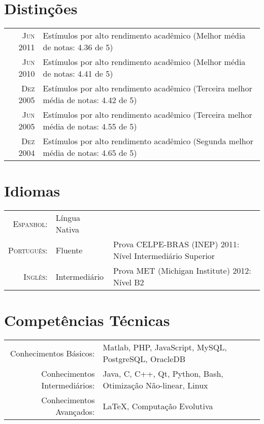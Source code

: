 \documentclass[a4paper,10pt]{article}
\begin{document}
\section{Distinções}
\begin{tabular}{rl}

  \textsc{Jun 2011} & Estímulos por alto rendimento acadêmico \footnotesize(Melhor média de notas: 4.36 de 5)\normalsize\\
  \textsc{Jun 2010} & Estímulos por alto rendimento acadêmico \footnotesize(Melhor média de notas: 4.41 de 5)\normalsize\\
  \textsc{Dez 2005} & Estímulos por alto rendimento acadêmico \footnotesize(Terceira melhor média de notas: 4.42 de 5)\normalsize\\
  \textsc{Jun 2005} & Estímulos por alto rendimento acadêmico \footnotesize(Terceira melhor média de notas: 4.55 de 5)\normalsize\\
  \textsc{Dez 2004} & Estímulos por alto rendimento acadêmico \footnotesize(Segunda melhor média de notas: 4.65 de 5)\normalsize\\

\end{tabular}

\section{Idiomas}
\begin{tabular}{rll}

  \textsc{Espanhol:}    & Língua Nativa     & \\
  \textsc{Português:}   & Fluente           & Prova \textsc{CELPE-BRAS} (INEP) 2011: Nível Intermediário Superior\\
  \textsc{Inglês:}      & Intermediário     & Prova \textsc{MET} (Michigan Institute) 2012: Nível B2 \\

\end{tabular}

\section{Competências Técnicas}
\begin{tabular}{rl}

  Conhecimentos Básicos:        & Matlab, PHP, JavaScript, MySQL, PostgreSQL, OracleDB \\
  Conhecimentos Intermediários: & Java, C, C++, Qt, Python, Bash, Otimização Não-linear, Linux\\
  Conhecimentos Avançados:      & \LaTeX, Computação Evolutiva 

\end{tabular}
\end{document}

